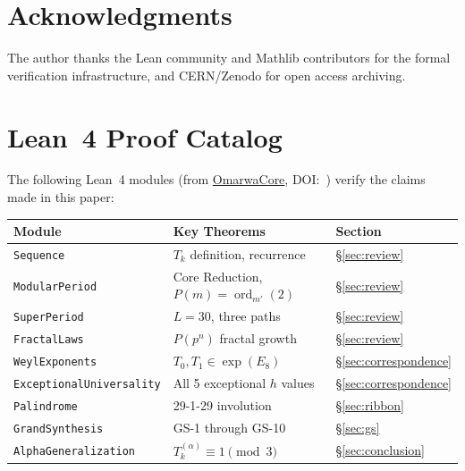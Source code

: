 \documentclass[11pt, a4paper]{article}
\theoremstyle{plain}
\theoremstyle{definition}
\theoremstyle{remark}
\newcommand{\ord}{\operatorname{ord}}
\begin{document}
\section*{Acknowledgments}

The author thanks the Lean community and Mathlib contributors for
the formal verification infrastructure, and CERN/Zenodo for open
access archiving.


\appendix

\section{Lean~4 Proof Catalog}
\label{app:lean}

The following Lean~4 modules (from
\href{https://github.com/omarwa622/OmarwaCore}{OmarwaCore},
DOI:~\cite{paket1}) verify the claims made in this paper:

\begin{center}
\begin{tabular}{@{}lll@{}}
\toprule
Module & Key Theorems & Section \\
\midrule
\texttt{Sequence} & $T_k$ definition, recurrence & \S\ref{sec:review} \\
\texttt{ModularPeriod} & Core Reduction, $P(m) = \ord_{m'}(2)$ & \S\ref{sec:review} \\
\texttt{SuperPeriod} & $L = 30$, three paths & \S\ref{sec:review} \\
\texttt{FractalLaws} & $P(p^n)$ fractal growth & \S\ref{sec:review} \\
\texttt{WeylExponents} & $T_0, T_1 \in \exp(E_8)$ & \S\ref{sec:correspondence} \\
\texttt{ExceptionalUniversality} & All 5 exceptional $h$ values & \S\ref{sec:correspondence} \\
\texttt{Palindrome} & 29-1-29 involution & \S\ref{sec:ribbon} \\
\texttt{GrandSynthesis} & GS-1 through GS-10 & \S\ref{sec:gs} \\
\texttt{AlphaGeneralization} & $T_k^{(\alpha)} \equiv 1 \pmod{3}$ & \S\ref{sec:conclusion} \\
\bottomrule
\end{tabular}
\end{center}
\end{document}
